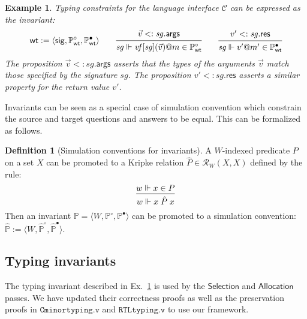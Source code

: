 \documentclass[11pt,oneside,draft]{book}
\newtheorem{example}[theorem]{Example}
\theoremstyle{definition}
\newtheorem{definition}[theorem]{Definition}
\newcommand{\kw}[1]{\ensuremath{ \mathsf{#1} }}
\newcommand{\que}{\circ}         %
\newcommand{\ans}{\bullet}       %
\begin{document}
\begin{example} \label{ex:wt} %
Typing constraints for the language interface $\mathcal{C}$
can be expressed as the invariant:
\[
  \kw{wt} :=
    \langle
      \kw{sig},
      \mathbb{P}_\kw{wt}^\que,
      \mathbb{P}_\kw{wt}^\ans
    \rangle
  \qquad
  \begin{prooftree}
    \hypo{\vec{v} <: \mathit{sg}.\kw{args}}
    \infer1{\mathit{sg} \Vdash
      \mathit{vf}[\mathit{sg}](\vec{v})@m \in \mathbb{P}_\kw{wt}^\que}
  \end{prooftree}
  \qquad
  \begin{prooftree}
    \hypo{v' <: \mathit{sg}.\kw{res}}
    \infer1{\mathit{sg} \Vdash
      v'@m' \in \mathbb{P}_\kw{wt}^\ans}
  \end{prooftree}
\]
The proposition $\vec{v} <: \mathit{sg}.\kw{args}$
asserts that the types of the arguments $\vec{v}$
match those specified by the signature $\mathit{sg}$.
The proposition $v' <: \mathit{sg}.\kw{res}$
asserts a similar property for the return value $v'$.
\end{example}

Invariants can be seen as a special case of simulation convention
which constrain the source and target questions and answers
to be equal.
This can be formalized as follows.

\begin{definition}[Simulation conventions for invariants]
A $W$-indexed predicate $P$ on a set $X$
can be promoted to a Kripke relation
$\hat{P} \in \mathcal{R}_W(X, X)$
defined by the rule:
\[
  \begin{prooftree}
    \hypo{w \Vdash x \in P}
    \infer1{w \Vdash x \mathrel{\hat{P}} x}
  \end{prooftree}
\]
Then an invariant
$\mathbb{P} = \langle W, \mathbb{P}^\que, \mathbb{P}^\ans \rangle$
can be promoted to a simulation convention:
$\hat{\mathbb{P}} :=
 \langle W, \hat{\mathbb{P}}^\que, \hat{\mathbb{P}}^\ans \rangle$.
\end{definition}


\subsection{Typing invariants} \label{sec:wt} %

The typing invariant described in Ex.~\ref{ex:wt}
is used by the $\kw{Selection}$ and $\kw{Allocation}$ passes.
We have updated their correctness proofs
as well as the preservation proofs in
$\texttt{Cminortyping.v}$ and $\texttt{RTLtyping.v}$
to use our framework.
\end{document}
